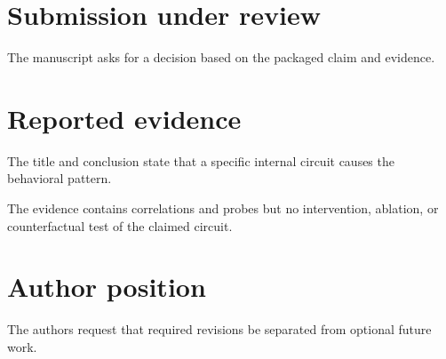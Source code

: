 \documentclass{article}
\begin{document}
\section{Submission under review}
The manuscript asks for a decision based on the packaged claim and evidence.
\section{Reported evidence}
The title and conclusion state that a specific internal circuit causes the behavioral pattern.

The evidence contains correlations and probes but no intervention, ablation, or counterfactual test of the claimed circuit.
\section{Author position}
The authors request that required revisions be separated from optional future work.
\end{document}

